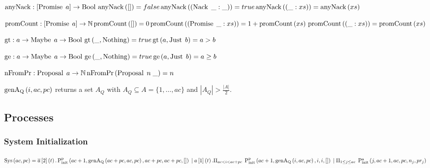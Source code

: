 $\operatorname{anyNack} : [\operatorname{Promise}\; a] \to \operatorname{Bool}\\
\operatorname{anyNack}\left([]\right) = false\\
\operatorname{anyNack}\left(\left(\operatorname{Nack}\; \_: \_\right)\right) = true\\
\operatorname{anyNack}\left(\left(\_:xs\right)\right) = \operatorname{anyNack}\left(xs\right)$

$\operatorname{promCount} : [\operatorname{Promise}\; a] \to \mathbb{N}\\
\operatorname{promCount}\left([]\right) = 0\\
\operatorname{promCount}\left(\left(\operatorname{Promise}\; \_:xs\right)\right) = 1 + \operatorname{promCount}\left(xs\right)\\
\operatorname{promCount}\left(\left(\_:xs\right)\right) = \operatorname{promCount}\left(xs\right)$

$\operatorname{gt}: a \to \operatorname{Maybe}\; a \to \operatorname{Bool}\\
\operatorname{gt}\left(\_, \operatorname{Nothing}\right) = true\\
\operatorname{gt}\left(a, \operatorname{Just}\; b\right) = a > b$

$\operatorname{ge}: a \to \operatorname{Maybe}\; a \to \operatorname{Bool}\\
\operatorname{ge}\left(\_, \operatorname{Nothing}\right) = true\\
\operatorname{ge}\left(a, \operatorname{Just}\; b\right) = a \ge b$

$\operatorname{nFromPr} : \operatorname{Proposal}\; a \to \mathbb{N}\\
\operatorname{nFromPr}\left(\operatorname{Proposal}\; n\; \_ \right) = n$

$\operatorname{genA_Q}\left(i, ac, pc\right)$ returns a set $A_Q$ with $A_Q \subseteq A = \{1, \dots, ac\}$ and $|A_Q| > \frac{|A|}{2}$.

\subsection{Processes}
\newcommand{\Sys}[2]{\operatorname{Sys}\left(#1, #2\right)}
\newcommand{\Pa}[0]{\operatorname{P^a}}
\newcommand{\Pp}[0]{\operatorname{P^p}}
\newcommand{\PaCont}[0]{\operatorname{P^a_{cont}}}

\newcommand{\PpInit}[5]{\operatorname{P^p_{init}}\left(#1, #2, #3, #4, #5\right)}
\newcommand{\PaInit}[6]{\operatorname{P^a_{init}}\left(#1, #2, #3, #4, #5, #6\right)}

\subsubsection{System Initialization}
\newcommand{\SessionRequest}[3]{\overline{#1}\left[#2\right]\left(#3\right)}
\newcommand{\SessionAccept}[3]{#1\left[#2\right]\left(#3\right)}
\newcommand{\ParallelFor}[1]{\Pi_{#1}\;}
\newcommand{\VectorV}[0]{\overrightarrow{V}}

$\Sys{ac}{pc} = \SessionRequest{a}{2}{t} . \PpInit{ac + 1}{\genAq{ac + pc}{ac}{pc}}{ac + pc}{ac + pc}{[]}\\
\Or \SessionAccept{a}{1}{t} . \ParallelFor{ac < i < ac + pc} \PpInit{ac + 1}{\genAq{i}{ac}{pc}}{i}{i}{[]} \\
\Or \ParallelFor{1 \le j \le ac} \PaInit{j}{ac + 1}{ac}{pc}{n_j}{pr_j}$

